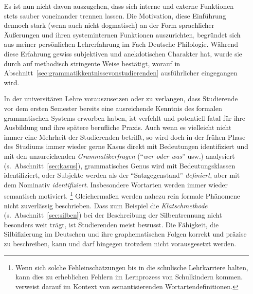 
Es ist nun nicht davon auszugehen, dass sich interne und externe Funktionen stets sauber voneinander trennen lassen.
Die Motivation, diese Einführung dennoch stark (wenn auch nicht dogmatisch) an der Form sprachlicher Äußerungen und ihren systeminternen Funktionen auszurichten, begründet sich aus meiner persönlichen Lehrerfahrung im Fach Deutsche Philologie.
Während diese Erfahrung gewiss subjektiven und anekdotischen Charakter hat, wurde sie durch \citet{SchaeferSayatz2017a} auf methodisch stringente Weise bestätigt, worauf in Abschnitt~\ref{sec:grammatikkentnissevonstudierenden} ausführlicher eingegangen wird.

In der universitären Lehre vorauszusetzen oder zu verlangen, dass Studierende vor dem ersten Semester bereits eine ausreichende Kenntnis des formalen grammatischen Systems erworben haben, ist verfehlt und potentiell fatal für ihre Ausbildung und ihre spätere berufliche Praxis.
Auch wenn es vielleicht nicht immer eine Mehrheit der Studierenden betrifft, so wird doch in der frühen Phase des Studiums immer wieder gerne Kasus direkt mit Bedeutungen identifiziert und mit den unzureichenden \textit{Grammatikerfragen} ("`\textit{wer oder was}"' usw.) analysiert (s.\ Abschnitt~\ref{sec:kasus}), grammatisches Genus wird mit Bedeutungsklassen identifiziert, oder Subjekte werden als der "`Satzgegenstand"' \textit{definiert}, aber mit dem Nominativ \textit{identifiziert}.
Insbesondere Wortarten werden immer wieder semantisch motiviert.%
\footnote{Wenn sich solche Fehleinschätzungen bis in die schulische Lehrkarriere halten, kann dies zu erheblichen Fehlern im Lernprozess von Schulkindern kommen.
\citet[178--179]{Bredel2013} verweist darauf im Kontext von semantisierenden Wortartendefinitionen.}
Gleichermaßen werden nahezu rein formale Phänomene nicht zuverlässig beschrieben.
Dass zum Beispiel die \textit{Klatschmethode} (s.\ Abschnitt~\ref{sec:silben}) bei der Beschreibung der Silbentrennung nicht besonders weit trägt, ist Studierenden meist bewusst.
Die Fähigkeit, die Silbifizierung im Deutschen und ihre graphematischen Folgen korrekt und präzise zu beschreiben, kann und darf hingegen trotzdem nicht vorausgesetzt werden.


